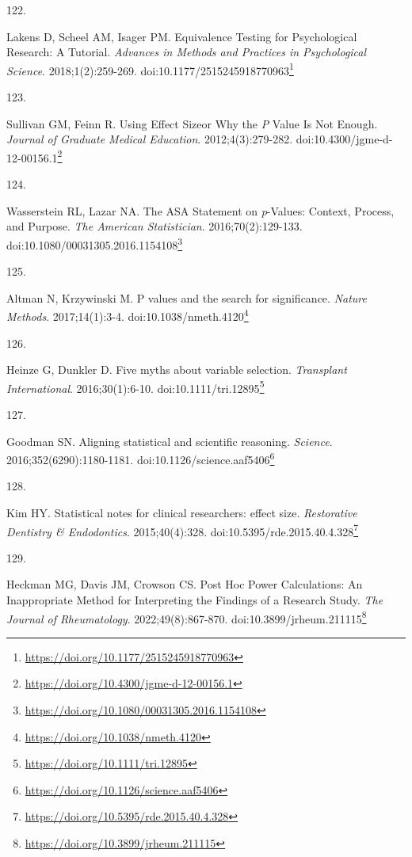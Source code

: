 \documentclass[
  a4paper,
]{book}
\newlength{\cslhangindent}
\newlength{\csllabelwidth}
\newlength{\cslentryspacingunit} %
\newenvironment{CSLReferences}[2] %
 {%
  \setlength{\parindent}{0pt}
  \ifodd #1
  \let\oldpar\par
  \def\par{\hangindent=\cslhangindent\oldpar}
  \fi
  \setlength{\parskip}{#2\cslentryspacingunit}
 }%
 {}
\newcommand{\CSLLeftMargin}[1]{\parbox[t]{\csllabelwidth}{#1}}
\newcommand{\CSLRightInline}[1]{\parbox[t]{\linewidth - \csllabelwidth}{#1}\break}
\renewcommand{\href}[2]{#2\footnote{\url{#1}}}
\begin{document}
\begin{CSLReferences}{0}{0}
\leavevmode{}%
\CSLLeftMargin{122. }%
\CSLRightInline{Lakens D, Scheel AM, Isager PM. Equivalence Testing for Psychological Research: A Tutorial. \emph{Advances in Methods and Practices in Psychological Science}. 2018;1(2):259-269. doi:\href{https://doi.org/10.1177/2515245918770963}{10.1177/2515245918770963}}

\leavevmode{}%
\CSLLeftMargin{123. }%
\CSLRightInline{Sullivan GM, Feinn R. Using Effect Size{\textemdash}or Why the {\emph{P}} Value Is Not Enough. \emph{Journal of Graduate Medical Education}. 2012;4(3):279-282. doi:\href{https://doi.org/10.4300/jgme-d-12-00156.1}{10.4300/jgme-d-12-00156.1}}

\leavevmode{}%
\CSLLeftMargin{124. }%
\CSLRightInline{Wasserstein RL, Lazar NA. The ASA Statement on {\emph{p}}-Values: Context, Process, and Purpose. \emph{The American Statistician}. 2016;70(2):129-133. doi:\href{https://doi.org/10.1080/00031305.2016.1154108}{10.1080/00031305.2016.1154108}}

\leavevmode{}%
\CSLLeftMargin{125. }%
\CSLRightInline{Altman N, Krzywinski M. P values and the search for significance. \emph{Nature Methods}. 2017;14(1):3-4. doi:\href{https://doi.org/10.1038/nmeth.4120}{10.1038/nmeth.4120}}

\leavevmode{}%
\CSLLeftMargin{126. }%
\CSLRightInline{Heinze G, Dunkler D. Five myths about variable selection. \emph{Transplant International}. 2016;30(1):6-10. doi:\href{https://doi.org/10.1111/tri.12895}{10.1111/tri.12895}}

\leavevmode{}%
\CSLLeftMargin{127. }%
\CSLRightInline{Goodman SN. Aligning statistical and scientific reasoning. \emph{Science}. 2016;352(6290):1180-1181. doi:\href{https://doi.org/10.1126/science.aaf5406}{10.1126/science.aaf5406}}

\leavevmode{}%
\CSLLeftMargin{128. }%
\CSLRightInline{Kim HY. Statistical notes for clinical researchers: effect size. \emph{Restorative Dentistry \& Endodontics}. 2015;40(4):328. doi:\href{https://doi.org/10.5395/rde.2015.40.4.328}{10.5395/rde.2015.40.4.328}}

\leavevmode{}%
\CSLLeftMargin{129. }%
\CSLRightInline{Heckman MG, Davis JM, Crowson CS. Post Hoc Power Calculations: An Inappropriate Method for Interpreting the Findings of a Research Study. \emph{The Journal of Rheumatology}. 2022;49(8):867-870. doi:\href{https://doi.org/10.3899/jrheum.211115}{10.3899/jrheum.211115}}


\end{CSLReferences}
\end{document}
